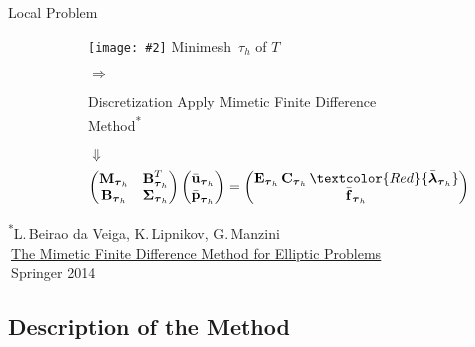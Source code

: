 \documentclass[svgnames]{beamer} %
\newcommand{\includegraphicsw}[2][1.]{\texttt{[image: \#2]}}
\newcommand{\vect}[1]{\boldsymbol{\mathbf{#1}}}
\newcommand{\mmesh}{{\vect{\mathcal \tau}_h}}
\begin{document}
\begin{frame}{Local Problem}
\begin{overlayarea}{\textwidth}{5cm}
{\begin{figure}
\begin{subfigure}{.3\linewidth}
					\includegraphicsw[.9]{ring_mini_voronoi_cell.png}
					Minimesh~$\mmesh$ of $T$
				\end{subfigure}%
				\begin{subfigure}{.1\linewidth}\centering
					\vskip -1.65cm
					$\Rightarrow\:\,$
				\end{subfigure}%
				\begin{subfigure}{.6\linewidth}\centering
					\begin{block}{Discretization}\centering
						Apply Mimetic Finite Difference\\Method\textsuperscript{*}
					\end{block}
					$\Downarrow$
					\begin{equation*}
						\begin{pmatrix}
							\vect M_\mmesh & \vect B^T_\mmesh \\
							\vect B_\mmesh & \vect \Sigma_\mmesh            
							\end{pmatrix} 
							\begin{pmatrix}
							\bar{\vect u}_\mmesh \\
							\bar{\vect p}_\mmesh        
						\end{pmatrix}
						= 
						\begin{pmatrix}
							\vect E_\mmesh\,\vect C_\mmesh\,\textcolor{Red}{\bar{\vect \lambda}_\mmesh} \\
							\bar{\vect f}_\mmesh        
						\end{pmatrix}
					\end{equation*}		
				\end{subfigure}%
			\end{figure}
			\setul{1pt}{.4pt} %
			\tiny{
				\textsuperscript{*}L.\,Beirao da Veiga, K.\,Lipnikov, G.\,Manzini\\
				$\:$\href{https://www.springer.com/us/book/9783319026626}{\ul{The Mimetic Finite Difference Method for Elliptic Problems}}\\
				$\:$Springer 2014
			}
		}
		\end{overlayarea}	
	\end{frame}

	\subsection{Description of the Method}
	
\end{document}
